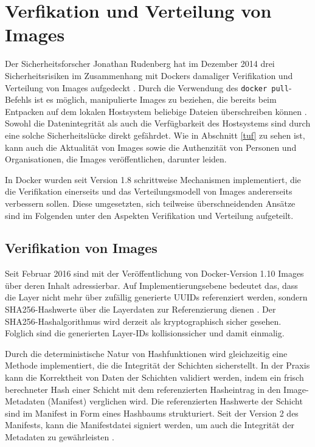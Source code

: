 \documentclass[../main.tex]{subfiles}
\begin{document}
  \section{Verfikation und Verteilung von Images}
    Der Sicherheitsforscher Jonathan Rudenberg hat im Dezember 2014 drei Sicherheitsrisiken im Zusammenhang mit Dockers damaliger Verifikation und Verteilung von Images aufgedeckt \cite{githubRegistryV1Issues}\cite{registryV1IssuesRudenberg}. Durch die Verwendung des \texttt{docker pull}-Befehls ist es möglich, manipulierte Images zu beziehen, die bereits beim Entpacken auf dem lokalen Hostsystem beliebige Dateien überschreiben können \cite{registryV1IssuesRedHat}. Sowohl die Datenintegrität als auch die Verfügbarkeit des Hostsystems sind durch eine solche Sicherheitslücke direkt gefährdet. Wie in Abschnitt \ref{tuf} zu sehen ist, kann auch die Aktualität von Images sowie die Authenzität von Personen und Organisationen, die Images veröffentlichen, darunter leiden.

    In Docker wurden seit Version 1.8 schrittweise Mechanismen implementiert, die die Verifikation einerseits und das Verteilungsmodell von Images andererseits verbessern sollen. Diese umgesetzten, sich teilweise überschneidenden Ansätze sind im Folgenden unter den Aspekten Verifikation und Verteilung aufgeteilt.

    \subsection{Verifikation von Images}
      Seit Februar 2016 sind mit der Veröffentlichung von Docker-Version 1.10 Images über deren Inhalt adressierbar. Auf Implementierungsebene bedeutet das, dass die Layer nicht mehr über zufällig generierte UUIDs referenziert werden, sondern SHA256-Hashwerte über die Layerdaten zur Referenzierung dienen \cite[S.16]{slideshareImageDistribution}. Der SHA256-Hashalgorithmus wird derzeit als kryptographisch sicher gesehen. Folglich sind die generierten Layer-IDs kollisionssicher und damit einmalig.

      Durch die deterministische Natur von Hashfunktionen wird gleichzeitig eine Methode implementiert, die die Integrität der Schichten sicherstellt. In der Praxis kann die Korrektheit von Daten der Schichten validiert werden, indem ein frisch berechneter Hash einer Schicht mit dem referenzierten Hasheintrag in den Image-Metadaten (Manifest) verglichen wird. Die referenzierten Hashwerte der Schicht sind im Manifest in Form eines Hashbaums strukturiert. Seit der Version 2 des Manifests, kann die Manifestdatei signiert werden, um auch die Integrität der Metadaten zu gewährleisten \cite{githubImageManifest21}.
\end{document}
